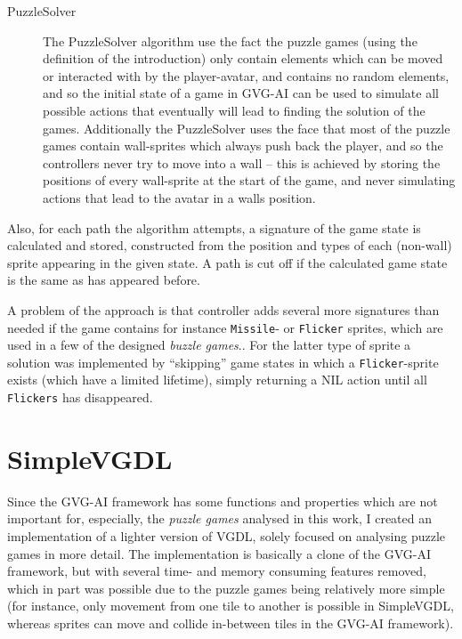 \documentclass[a4paper,titlepage,final]{report}
\begin{document}
\begin{description}
\item[PuzzleSolver]
The PuzzleSolver algorithm use the fact the puzzle games (using the definition of the introduction) only contain elements which can be moved or interacted with by the player-avatar, and contains no random elements, and so the initial state of a game in GVG-AI can be used to simulate all possible actions that eventually will lead to finding the solution of the games.
Additionally the PuzzleSolver uses the face that most of the puzzle games contain wall-sprites which always push back the player, and so the controllers never try to move into a wall -- this is achieved by storing the positions of every wall-sprite at the start of the game, and never simulating actions that lead to the avatar in a walls position.
\end{description}

Also, for each path the algorithm attempts, a signature of the game state is calculated and stored, constructed from the position and types of each (non-wall) sprite appearing in the given state. 
A path is cut off if the calculated game state is the same as has appeared before.

A problem of the approach is that controller adds several more signatures than needed if the game contains for instance \texttt{Missile}- or \texttt{Flicker} sprites, which are used in a few of the designed \textit{buzzle games}..
For the latter type of sprite a solution was implemented by ``skipping'' game states in which a \texttt{Flicker}-sprite exists (which have a limited lifetime), simply returning a NIL action until all \texttt{Flickers} has disappeared.




\section{SimpleVGDL}
\label{sec_fastvgdl}
Since the GVG-AI framework has some functions and properties which are not important for, especially, the \textit{puzzle games} analysed in this work, I created an implementation of a lighter version of VGDL, solely focused on analysing puzzle games in more detail.
The implementation is basically a clone of the GVG-AI framework, but with several time- and memory consuming features removed, which in part was possible due to the puzzle games being relatively more simple (for instance, only movement from one tile to another is possible in SimpleVGDL, whereas sprites can move and collide in-between tiles in the GVG-AI framework).
\end{document}
